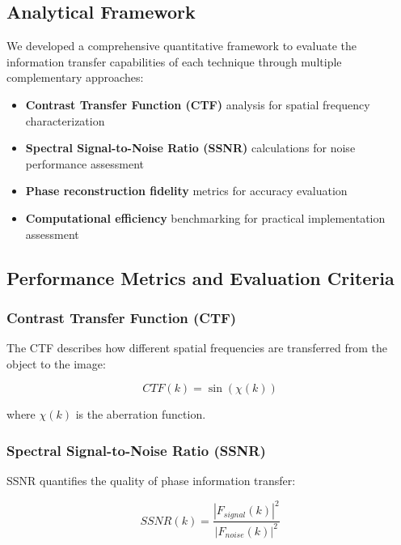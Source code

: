 \documentclass[
  letterpaper,
]{book}
\providecommand{\tightlist}{%
  \setlength{\itemsep}{0pt}\setlength{\parskip}{0pt}}
\begin{document}
\subsection{Analytical Framework}\label{analytical-framework-1}

We developed a comprehensive quantitative framework to evaluate the
information transfer capabilities of each technique through multiple
complementary approaches:

\begin{itemize}
\tightlist
\item
  \textbf{Contrast Transfer Function (CTF)} analysis for spatial
  frequency characterization
\item
  \textbf{Spectral Signal-to-Noise Ratio (SSNR)} calculations for noise
  performance assessment
\item
  \textbf{Phase reconstruction fidelity} metrics for accuracy evaluation
\item
  \textbf{Computational efficiency} benchmarking for practical
  implementation assessment
\end{itemize}

\subsection{Performance Metrics and Evaluation
Criteria}\label{performance-metrics-and-evaluation-criteria}

\subsubsection{Contrast Transfer Function
(CTF)}\label{contrast-transfer-function-ctf}

The CTF describes how different spatial frequencies are transferred from
the object to the image:

\[
CTF(k) = \sin(\chi(k))
\]

where \(\chi(k)\) is the aberration function.

\subsubsection{Spectral Signal-to-Noise Ratio
(SSNR)}\label{spectral-signal-to-noise-ratio-ssnr}

SSNR quantifies the quality of phase information transfer:

\[
SSNR(k) = \frac{|F_{signal}(k)|^2}{|F_{noise}(k)|^2}
\]

\end{document}
